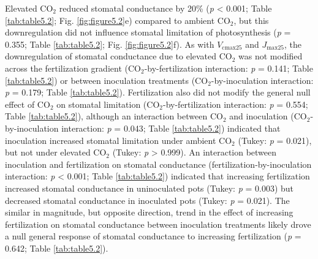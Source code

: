 Elevated CO$_2$ reduced stomatal conductance by 20\% (\textit{p} < 0.001; Table \ref{tab:table5.2}; Fig. \ref{fig:figure5.2}e) compared to ambient CO$_2$, but this downregulation did not influence stomatal limitation of photosynthesis (\textit{p} = 0.355; Table \ref{tab:table5.2}; Fig. \ref{fig:figure5.2}f). As with $V_\mathrm{cmax25}$ and $J_\mathrm{max25}$, the downregulation of stomatal conductance due to elevated CO$_2$ was not modified across the fertilization gradient (CO$_2$-by-fertilization interaction: \textit{p} = 0.141; Table \ref{tab:table5.2}) or between inoculation treatments (CO$_2$-by-inoculation interaction: \textit{p} = 0.179; Table \ref{tab:table5.2}). Fertilization also did not modify the general null effect of CO$_2$ on stomatal limitation (CO$_2$-by-fertilization interaction: \textit{p} = 0.554; Table \ref{tab:table5.2}), although an interaction between CO$_2$ and inoculation (CO$_2$-by-inoculation interaction: \textit{p} = 0.043; Table \ref{tab:table5.2}) indicated that inoculation increased stomatal limitation under ambient CO$_2$ (Tukey: \textit{p} = 0.021), but not under elevated CO$_2$ (Tukey: \textit{p} > 0.999). An interaction between inoculation and fertilization on stomatal conductance (fertilization-by-inoculation interaction: \textit{p} < 0.001; Table \ref{tab:table5.2}) indicated that increasing fertilization increased stomatal conductance in uninoculated pots (Tukey: \textit{p} = 0.003) but decreased stomatal conductance in inoculated pots (Tukey: \textit{p} = 0.021). The similar in magnitude, but opposite direction, trend in the effect of increasing fertilization on stomatal conductance between inoculation treatments likely drove a null general response of stomatal conductance to increasing fertilization (\textit{p} = 0.642; Table \ref{tab:table5.2}).

